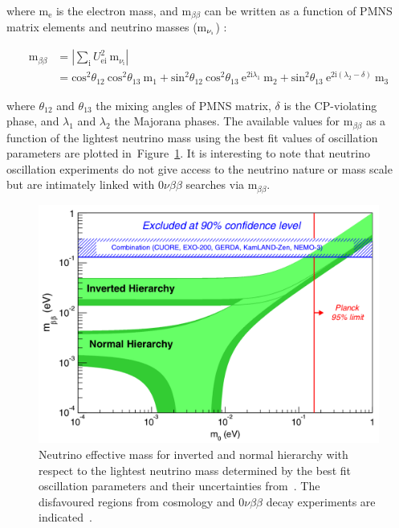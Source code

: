 \documentclass[main.tex]{subfiles}
\begin{document}
\bigskip


\NI where m$_\text{e}$ is the electron mass, and m$_{\beta\beta}$ can be written as a function of PMNS matrix elements and neutrino masses (m$_{\nu_\text{\i}}$) : 


\begin{equation}
\begin{split}
\text{m}_{\beta\beta} & = |\sum_\text{i}U_{\text{ei}}^\text{2}~\text{m}_{\nu_\text{i}} | \\
 & = \text{cos}^\text{2}\theta_{\text{12}}~\text{cos}^\text{2}\theta_{\text{13}}~\text{m}_\text{1} + \text{sin}^\text{2}\theta_{\text{12}}~\text{cos}^\text{2}\theta_{\text{13}}~\text{e}^{\text{2i}\lambda_\text{1}} ~\text{m}_\text{2} + \text{sin}^\text{2}\theta_{\text{13}}~\text{e}^{\text{2i}(\lambda_\text{2}-\delta)}~\text{m}_\text{3}
\end{split}
\end{equation}


\bigskip


\NI where $\theta_{\text{12}}$ and $\theta_{\text{13}}$ the mixing angles of PMNS matrix, $\delta$ is the CP-violating phase, and $\lambda_\text{1}$ and $\lambda_\text{2}$ the Majorana phases. The available values for m$_{\beta\beta}$ as a function of the lightest neutrino mass using the best fit values of oscillation parameters are plotted in~Figure~\ref{EffectiveMassNMM}. It is interesting to note that neutrino oscillation experiments do not give access to the neutrino nature or mass scale but are intimately linked with 0$\nu\beta\beta$ searches via m$_{\beta\beta}$. 


\begin{figure}[h!]
\begin{center}
\includegraphics[scale=0.22]{pictures/Chap2/m1NuMassContours2sigma_v4.png}
\caption{Neutrino effective mass for inverted and normal hierarchy with respect to the lightest neutrino mass determined by the best fit oscillation parameters and their uncertainties from~\cite{GlobalFitNeutrinoParameter}. The disfavoured regions from cosmology and 0$\nu\beta\beta$ decay experiments are indicated~\cite{MeffVsM0}.}
\label{EffectiveMassNMM}
\end{center}
\end{figure}
\end{document}
